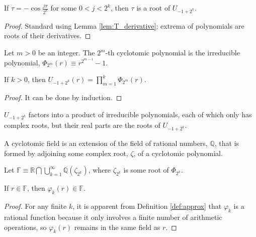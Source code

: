 \begin{lemma}
  \label{lem:extrema}
  If $\tau = -\cos\frac{j\pi}{2^k}$ for some $0 < j < 2^k$, then $\tau$ is a root of $U_{-1 + 2^k}$.
\end{lemma}
\begin{proof}
  Standard using Lemma \ref{lem:T_derivative}; extrema of polynomials are roots of their derivatives.
\end{proof}

\begin{definition}
  Let $m > 0$ be an integer. The $2^m$-th cyclotomic polynomial is the irreducible polynomial, $\Phi_{2^m}\left(r\right) \equiv r^{2^{m - 1}} - 1$.
\end{definition}

\begin{lemma}
  \label{lem:factorization}
  If $k > 0$, then $U_{-1 + 2^k}\left(r\right) = \prod\limits_{m = 1}^k \Phi_{2^m}\left(r\right)$.
\end{lemma}
\begin{proof}
  It can be done by induction.
\end{proof}
\begin{remark*}
$U_{-1 + 2^k}$ factors into a product of irreducible polynomials, each of which only has complex roots, but their real parts are the roots of $U_{-1 + 2^k}$.
\end{remark*}
\begin{definition}
  A cyclotomic field is an extension of the field of rational numbers, $\mathbb{Q}$, that is formed by adjoining some complex root, $\zeta$, of a cyclotomic polynomial.
\end{definition}

\begin{definition}
  \label{def:F}
  Let $\mathbb{F} \equiv \mathbb{R} \bigcap \bigcup\limits_{k = 1}^\infty \mathbb{Q}\left(\zeta_{2^k}\right)$, where $\zeta_{2^k}$ is some root of $\Phi_{2^k}$.
\end{definition}

\begin{lemma}
  \label{lem:in_F}
  If $r \in \mathbb{F}$, then $\varphi_k\left(r\right) \in \mathbb{F}$.
\end{lemma}
\begin{proof}
  For any finite $k$, it is apparent from Definition \ref{def:approx} that $\varphi_k$ is a rational function because it only involves a finite number of arithmetic operations, so $\varphi_k\left(r\right)$ remains in the same field as $r$.
\end{proof}

